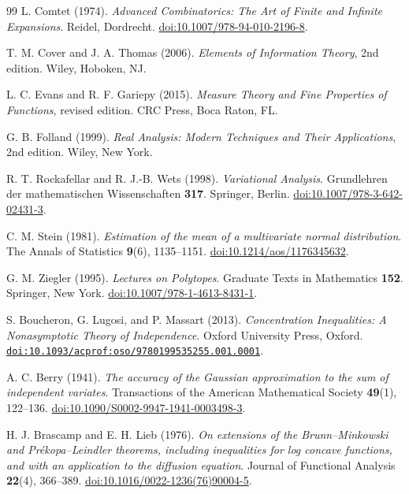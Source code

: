 \documentclass[11pt,letterpaper]{article}
\theoremstyle{remark}
\begin{document}
\begin{thebibliography}{99}
L. Comtet (1974).
\emph{Advanced Combinatorics: The Art of Finite and Infinite Expansions}.
Reidel, Dordrecht.
\href{https://doi.org/10.1007/978-94-010-2196-8}{doi:10.1007/978-94-010-2196-8}.

T. M. Cover and J. A. Thomas (2006).
\emph{Elements of Information Theory}, 2nd edition.
Wiley, Hoboken, NJ.

L. C. Evans and R. F. Gariepy (2015).
\emph{Measure Theory and Fine Properties of Functions}, revised edition.
CRC Press, Boca Raton, FL.

G. B. Folland (1999).
\emph{Real Analysis: Modern Techniques and Their Applications}, 2nd edition.
Wiley, New York.

R. T. Rockafellar and R. J.-B. Wets (1998).
\emph{Variational Analysis}.
Grundlehren der mathematischen Wissenschaften \textbf{317}.
Springer, Berlin.
\href{https://doi.org/10.1007/978-3-642-02431-3}{doi:10.1007/978-3-642-02431-3}.

C. M. Stein (1981).
\emph{Estimation of the mean of a multivariate normal distribution}.
The Annals of Statistics \textbf{9}(6), 1135--1151.
\href{https://doi.org/10.1214/aos/1176345632}{doi:10.1214/aos/1176345632}.

G. M. Ziegler (1995).
\emph{Lectures on Polytopes}.
Graduate Texts in Mathematics \textbf{152}. Springer, New York.
\href{https://doi.org/10.1007/978-1-4613-8431-1}{doi:10.1007/978-1-4613-8431-1}.

S. Boucheron, G. Lugosi, and P. Massart (2013).
\emph{Concentration Inequalities: A Nonasymptotic Theory of Independence}.
Oxford University Press, Oxford.
\href{https://doi.org/10.1093/acprof:oso/9780199535255.001.0001}{\nolinkurl{doi:10.1093/acprof:oso/9780199535255.001.0001}}.

A. C. Berry (1941).
\emph{The accuracy of the Gaussian approximation to the sum of independent variates}.
Transactions of the American Mathematical Society \textbf{49}(1), 122--136.
\href{https://doi.org/10.1090/S0002-9947-1941-0003498-3}{doi:10.1090/S0002-9947-1941-0003498-3}.

H. J. Brascamp and E. H. Lieb (1976).
\emph{On extensions of the Brunn--Minkowski and Pr\'ekopa--Leindler
theorems, including inequalities for log concave functions, and with
an application to the diffusion equation}.
Journal of Functional Analysis \textbf{22}(4), 366--389.
\href{https://doi.org/10.1016/0022-1236(76)90004-5}{doi:10.1016/0022-1236(76)90004-5}.


\end{thebibliography}
\end{document}

